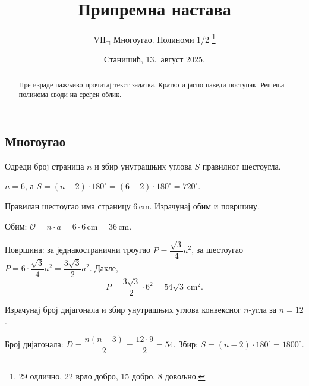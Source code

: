 \documentclass[11pt,a5paper,twoside,addpoints,noanswers]{exam} %
\title{Припремна настава}
\author{$\mathrm{VII}_\Box$ Многоугао. Полиноми 1/2
 \thanks{
  29 одлично,
  22 врло добро,
  15 добро,
   8 довољно.
 }
}
\date{Станишић, 13.\ август 2025.}
\newcommand{\measure}[2]{#1\,\mathrm{#2}}
\newcommand{\variant}[3]{#1}
\begin{document}
\maketitle
\thispagestyle{headandfoot}

\ifprintanswers\else
\begin{flushleft}\scriptsize
\gradetable[h]
\end{flushleft}
\fi

\begin{abstract}
Пре израде пажљиво прочитај текст задатка. Кратко и јасно наведи поступак. Решења полинома своди на сређен облик.
\end{abstract}

\begin{questions}

\section*{Многоугао}

\question[3]
Одреди број страница $n$ и збир унутрашњих углова $S$ правилног
\variant{шестоугла}{осмоугла}{десетоугла}.
\begin{solution}[\stretch 2]
$n=\variant{6}{8}{10}$, а $S=(n-2)\cdot 180^\circ
= (\variant{6}{8}{10}-2)\cdot 180^\circ
= \variant{720^\circ}{1080^\circ}{1440^\circ}$.
\end{solution}

\question[3]
Правилан \variant{шестоугао}{троугао}{шестоугао} има страницу
$\measure{\variant{6}{12}{4}}{cm}$.
Израчунај обим и површину.
\begin{solution}[\stretch 2]
Обим: $\mathcal{O}=n\cdot a=\variant{6}{3}{6}\cdot
\measure{\variant{6}{12}{4}}{cm}
= \measure{\variant{36}{36}{24}}{cm}$.

Површина: за једнакостранични троугао $P=\dfrac{\sqrt{3}}{4}a^2$,
за шестоугао $P=6\cdot\dfrac{\sqrt{3}}{4}a^2=\dfrac{3\sqrt{3}}{2}a^2$.
Дакле,
\[
P=\variant{
\dfrac{3\sqrt{3}}{2}\cdot 6^2
= 54\sqrt{3}\,\mathrm{cm}^2
}{
\dfrac{\sqrt{3}}{4}\cdot 12^2
= 36\sqrt{3}\,\mathrm{cm}^2
}{
\dfrac{3\sqrt{3}}{2}\cdot 4^2
= 24\sqrt{3}\,\mathrm{cm}^2
}.
\]
\end{solution}

\question[3]
Израчунај број дијагонала и збир унутрашњих углова конвексног
$n$-угла за \(n=\variant{12}{15}{10}\).
\begin{solution}[\stretch 2]
Број дијагонала: $D=\dfrac{n(n-3)}{2}
=\variant{\dfrac{12\cdot 9}{2}=54}{\dfrac{15\cdot 12}{2}=90}{\dfrac{10\cdot 7}{2}=35}$.
Збир: $S=(n-2)\cdot 180^\circ
=\variant{1800^\circ}{2340^\circ}{1440^\circ}$.
\end{solution}


\end{questions}
\end{document}
